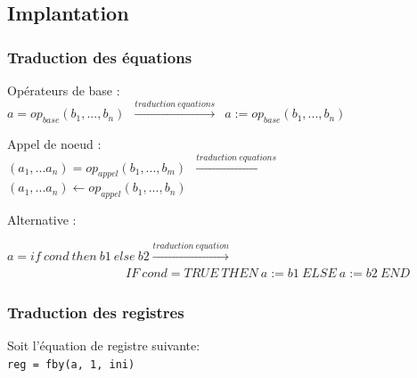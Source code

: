 \documentclass[10pt]{beamer}
\begin{document}
\subsection{Implantation}
\frame{\subsectionpage}

\begin{frame}
  \frametitle{Traduction des équations}

Opérateurs de base :\\
\texttt{$a = op_{base}(b_1,...,b_n)$ $\xrightarrow{traduction ~
equations}$ $a := op_{base}(b_1,...,b_n)$}

\vspace{0.6cm}
Appel de noeud :\\
\texttt{$(a_1, ... a_n) = op_{appel}(b_1, ..., b_m)$
$\xrightarrow{traduction ~ equations}$ $(a_1, ... a_n) \leftarrow
op_{appel}(b_1,..., b_n)$} 

\vspace{0.6cm}
Alternative :\\
\noindent
\begin{scriptsize}
\texttt{$a=if~cond~then~b1~else~b2\xrightarrow{traduction~equation}$\\
$~~~~~~~~~~~~~~~~~~~~~~~~~~~~~~~~~~~~~~~~~~~IF~cond=TRUE~THEN~a:=b1~ELSE~a:=b2~END$}
\end{scriptsize}

\end{frame}


\begin{frame}
\frametitle{Traduction des registres}
Soit l'équation de registre suivante:\\
\texttt{reg = fby(a, 1, ini)}
\end{frame}
\end{document}
